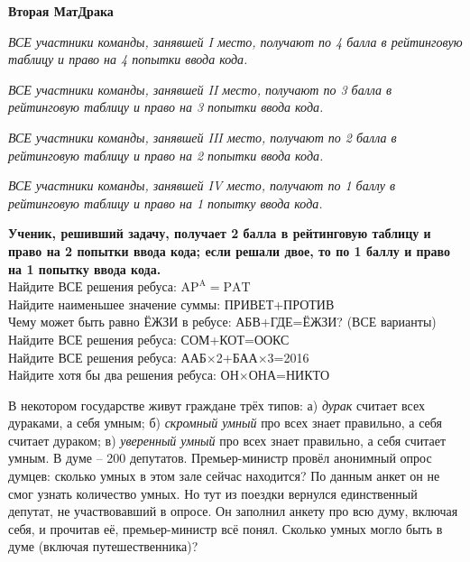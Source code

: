 \centerline{\bf \Huge Вторая МатДрака}

\textit{ВСЕ участники команды, занявшей I место, получают по 4 балла в рейтинговую таблицу и право на 4 попытки ввода кода.}

\textit{ВСЕ участники команды, занявшей II место, получают по 3 балла в рейтинговую таблицу и право на 3 попытки ввода кода.}

\textit{ВСЕ участники команды, занявшей III место, получают по 2 балла в рейтинговую таблицу и право на 2 попытки ввода кода.}

\textit{ВСЕ участники команды, занявшей IV место, получают по 1 баллу в рейтинговую таблицу и право на 1 попытку ввода кода.}

\textbf{Ученик, решивший задачу, получает 2 балла в рейтинговую таблицу и право на 2 попытки ввода кода; если решали двое, то по 1 баллу и право на 1 попытку ввода кода.}\\


 Найдите ВСЕ решения ребуса: $\mathrm{AP}^{\mathrm{A}}=\mathrm{PAT}$\\


 Найдите наименьшее значение суммы: ПРИВЕТ+ПРОТИВ\\

 Чему может быть равно ЁЖЗИ в ребусе: АБВ+ГДЕ=ЁЖЗИ? (ВСЕ варианты)\\

 Найдите ВСЕ решения ребуса: СОМ+КОТ=ООКС\\

 Найдите ВСЕ решения ребуса: ААБ$\times$2+БАА$\times$3=2016\\

 Найдите хотя бы два решения ребуса: ОН$\times$ОНА=НИКТО\\

\newpage

 В некотором государстве живут граждане трёх типов:  а) \textit{дурак} считает всех дураками, а себя умным;  б) \textit{скромный умный} про всех знает правильно, а себя считает дураком;  в) \textit{уверенный умный} про всех знает правильно, а себя считает умным. В думе – 200 депутатов. Премьер-министр провёл анонимный опрос думцев: сколько умных в этом зале сейчас находится? По данным анкет он не смог узнать количество умных. Но тут из поездки вернулся единственный депутат, не участвовавший в опросе. Он заполнил анкету про всю думу, включая себя, и прочитав её, премьер-министр всё понял. Сколько умных могло быть в думе (включая путешественника)?\\

